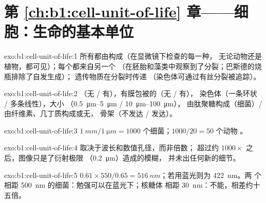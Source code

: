 \section*{第 \ref{ch:b1:cell-unit-of-life} 章——细胞：生命的基本单位}

\begin{solution}{exo:b1:cell-unit-of-life:1}
所有都由构成（在显微镜下检查的每一种，
无论动物还是植物，都可见）；每个都来自另一个
（在胚胎和藻类中观察到了分裂；巴斯德的烧瓶排除了自发生成）；
遗传物质在分裂时传递
（染色体可通过有丝分裂被追踪）。
\end{solution}

\begin{solution}{exo:b1:cell-unit-of-life:2}
（无 / 有），有膜包被的（无 / 有），
染色体（一条环状 / 多条线性），大小
（\qtyrange{0.5}{5}{\micro m} / \qtyrange{10}{100}{\micro m}），
由肽聚糖构成（细菌）/ 由纤维素、几丁质构成或无，
骨架（不发达 / 发达）。
\end{solution}

\begin{solution}{exo:b1:cell-unit-of-life:3}
$\qty{1}{mm}/\qty{1}{\micro m} = 1000$ 个细菌；$1000/20 = 50$ 个动物
。
\end{solution}

\begin{solution}{exo:b1:cell-unit-of-life:4}
取决于波长和数值孔径，而非倍数；
超过约 $1000\times$ 之后，图像只是了衍射极限
（\qty{0.2}{\micro m}）造成的模糊，
并未出任何新的细节。
\end{solution}

\begin{solution}{exo:b1:cell-unit-of-life:5}
$0.61\times 550/0.65 = \qty{516}{nm}$；若用蓝光则为 \qty{422}{nm}。两
个相距 \qty{500}{nm} 的细菌：勉强可以在蓝光下；核糖体
相距 \qty{30}{nm}：不能，相差约十五倍。
\end{solution}

